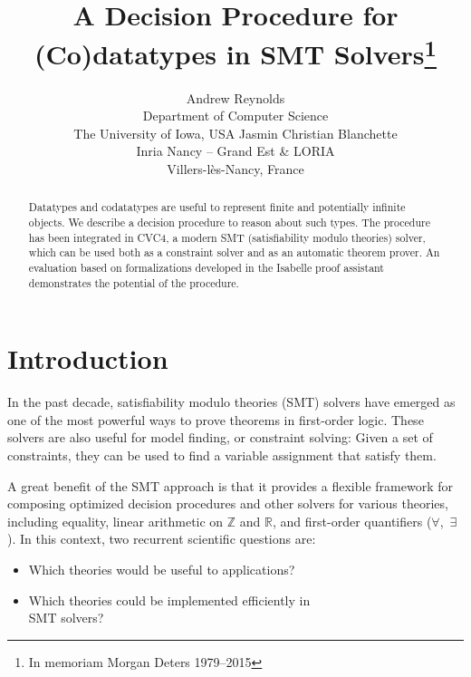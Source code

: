 \documentclass[letter]{article}
\theoremstyle{plain}
\theoremstyle{definition}
\begin{document}
\title{A Decision Procedure for (Co)datatypes in SMT Solvers\thanks{In memoriam Morgan Deters 1979--2015}}

\author {Andrew Reynolds \\
Department of Computer Science \\
The University of Iowa, USA
\And
Jasmin Christian Blanchette \\
Inria Nancy -- Grand Est \& LORIA \\
Villers-l\`es-Nancy, France
}



\maketitle

\begin{abstract}
Datatypes and codatatypes are useful to represent finite and potentially
infinite objects. We describe a decision procedure
to reason about such types. The procedure has been
integrated in CVC4, a modern SMT (satisfiability modulo theories)
solver, which can be used both as a constraint solver and as an
automatic theorem prover. An evaluation based on formalizations developed
in the Isabelle proof assistant demonstrates the potential of the
procedure.
\end{abstract}

\section{Introduction}
\label{sec:introduction}

In the past decade, satisfiability modulo theories (SMT) solvers
\cite{nieuwenhuis-et-al-2006}
have emerged as one of the most powerful ways to
prove theorems in first-order logic. These solvers are also useful for model
finding, or constraint solving: Given a set of constraints, they can be used
to find a variable assignment that satisfy them.

A great benefit of the SMT approach is that it provides a flexible framework
for composing optimized decision procedures and other solvers for various
theories, including equality, linear arithmetic on $\mathbb{Z}$ and
$\mathbb{R}$, and first-order quantifiers ($\forall$,~$\exists$). In this
context, two recurrent scientific questions are:
\begin{itemize}
\item Which theories would be useful to applications?
\item Which theories could be implemented efficiently in \\ %
SMT solvers?
\end{itemize}
\end{document}
